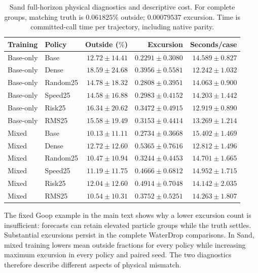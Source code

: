 \begin{table}[!ht]
\centering\small
\setlength{\tabcolsep}{5pt}\renewcommand{\arraystretch}{1.12}
\caption{Sand full-horizon physical diagnostics and descriptive cost. For complete groups, matching truth is $0.061825\%$ outside; $0.00079537$ excursion. Time is committed-call time per trajectory, including native parity.}
\label{tab:sand-all-cost}
\begin{tabular}{llrrr}
\toprule
Training & Policy & Outside ($\%$) & Excursion & Seconds/case\\
\midrule
Base-only & Base & $12.72\pm14.41$ & $0.2291\pm0.3080$ & $14.589\pm0.827$\\
Base-only & Dense & $18.59\pm24.68$ & $0.3956\pm0.5581$ & $12.242\pm1.032$\\
Base-only & Random25 & $14.78\pm18.32$ & $0.2808\pm0.3951$ & $14.063\pm0.900$\\
Base-only & Speed25 & $14.58\pm16.88$ & $0.2983\pm0.4152$ & $14.203\pm1.442$\\
Base-only & Risk25 & $16.34\pm20.62$ & $0.3472\pm0.4915$ & $12.919\pm0.890$\\
Base-only & RMS25 & $15.58\pm19.49$ & $0.3153\pm0.4414$ & $13.269\pm1.214$\\
Mixed & Base & $10.13\pm11.11$ & $0.2734\pm0.3668$ & $15.402\pm1.469$\\
Mixed & Dense & $12.72\pm12.60$ & $0.5365\pm0.7616$ & $12.812\pm1.496$\\
Mixed & Random25 & $10.47\pm10.94$ & $0.3244\pm0.4453$ & $14.701\pm1.665$\\
Mixed & Speed25 & $11.19\pm11.75$ & $0.4666\pm0.6812$ & $14.952\pm1.715$\\
Mixed & Risk25 & $12.04\pm12.60$ & $0.4914\pm0.7048$ & $14.142\pm2.035$\\
Mixed & RMS25 & $10.54\pm10.31$ & $0.3752\pm0.5251$ & $14.263\pm1.807$\\
\bottomrule
\end{tabular}
\end{table}


The fixed Goop example in the main text shows why a lower excursion count is insufficient: forecasts can retain elevated particle groups while the truth settles. Substantial excursions persist in the complete WaterDrop comparisons. In Sand, mixed training lowers mean outside fractions for every policy while increasing maximum excursion in every policy and paired seed. The two diagnostics therefore describe different aspects of physical mismatch.

